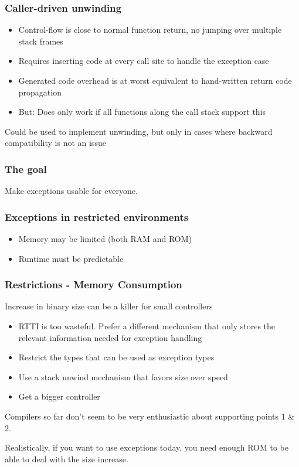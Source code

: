 \documentclass[aspectratio=169]{beamer}
\newif\iftransitions
\newcommand{\cpause}{\iftransitions \pause \fi}
\begin{document}
\begin{frame}
  \frametitle{Caller-driven unwinding}
  
  \begin{itemize}
  \item Control-flow is close to normal function return, no jumping over multiple stack frames
  \cpause
  \item Requires inserting code at every call site to handle the exception case
  \cpause
  \item Generated code overhead is at worst equivalent to hand-written return code propagation
  \cpause
  \item But: Does only work if all functions along the call stack support this
  \end{itemize}
  \cpause
  Could be used to implement unwinding, but only in cases where backward compatibility is not an issue
\end{frame}


\begin{frame}
  \frametitle{The goal}

  \begin{center}
    Make exceptions usable for everyone.
  \end{center}
\end{frame}


\begin{frame}
\frametitle{Exceptions in restricted environments}

\begin{itemize}
\cpause \item Memory may be limited (both RAM and ROM)
\cpause \item Runtime must be predictable
\end{itemize}

\end{frame}


\begin{frame}
\frametitle{Restrictions - Memory Consumption}

Increase in binary size can be a killer for small controllers

\begin{itemize}
\cpause \item RTTI is too wasteful. Prefer a different mechanism that only stores the relevant information needed for exception handling
\cpause \item Restrict the types that can be used as exception types
\cpause \item Use a stack unwind mechanism that favors size over speed
\cpause \item Get a bigger controller
\end{itemize}

\cpause Compilers so far don't seem to be very enthusiastic about supporting points 1 \& 2.

\cpause Realistically, if you want to use exceptions today, you need enough ROM to be able to deal with the size increase.
\end{frame}
\end{document}
